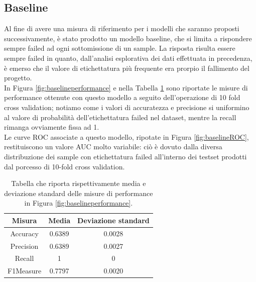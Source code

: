 \subsection{Baseline}
Al fine di avere una misura di riferimento per i modelli che saranno proposti successivamente, è stato prodotto un modello baseline, che si limita a rispondere sempre failed ad ogni sottomissione di un sample. La risposta risulta essere sempre failed in quanto, dall'analisi esplorativa dei dati effettuata in precedenza, è emerso che il valore di etichettatura più frequente era prorpio il fallimento del progetto.\\
In Figura \ref{fig:baselineperformance} e nella Tabella \ref{tab:baselineperformance} sono riportate le misure di performance ottenute con questo modello a seguito dell'operazione di 10 fold cross validation; notiamo come i valori di accuratezza e precisione si uniformino al valore di  probabilità dell'etichettatura failed nel dataset, mentre la recall rimanga ovviamente fissa ad 1.\\
Le curve ROC associate a questo modello, ripotate in Figura \ref{fig:baselineROC}, restituiscono un valore AUC molto variabile: ciò è dovuto dalla diversa distribuzione dei sample con etichettatura failed all'interno dei testset prodotti dal porcesso di 10-fold cross validation.
\begin{table}[h!]
	\caption{Tabella che riporta rispettivamente media e deviazione standard delle misure di performance in Figura \ref{fig:baselineperformance}.}
	\label{tab:baselineperformance}
	\centering
	\begin{tabular}{c|cc}
		Misura & Media & Deviazione standard \\
		\hline
		Accuracy & 0.6389 & 0.0028 \\ 
		Precision & 0.6389 & 0.0027 \\
		Recall & 1 & 0 \\
		F1Measure & 0.7797 & 0.0020 \\
	\end{tabular}
\end{table} 
